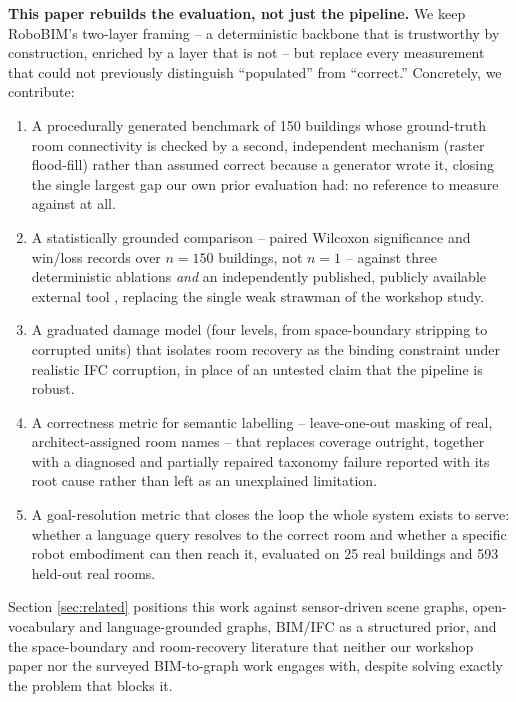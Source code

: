 \documentclass[a4paper, 10pt, conference]{ieeeconf}
\begin{document}
\textbf{This paper rebuilds the evaluation, not just the pipeline.} We keep RoboBIM's two-layer framing -- a deterministic backbone that is trustworthy by construction, enriched by a layer that is not -- but replace every measurement that could not previously distinguish ``populated'' from ``correct.'' Concretely, we contribute:
\begin{enumerate}
\setlength{\itemsep}{1pt}
\item A procedurally generated benchmark of 150 buildings whose ground-truth room connectivity is checked by a second, independent mechanism (raster flood-fill) rather than assumed correct because a generator wrote it, closing the single largest gap our own prior evaluation had: no reference to measure against at all.
\item A statistically grounded comparison -- paired Wilcoxon significance and win/loss records over $n=150$ buildings, not $n=1$ -- against three deterministic ablations \emph{and} an independently published, publicly available external tool \cite{bjornskov2024ifc2graph}, replacing the single weak strawman of the workshop study.
\item A graduated damage model (four levels, from space-boundary stripping to corrupted units) that isolates room recovery as the binding constraint under realistic IFC corruption, in place of an untested claim that the pipeline is robust.
\item A correctness metric for semantic labelling -- leave-one-out masking of real, architect-assigned room names -- that replaces coverage outright, together with a diagnosed and partially repaired taxonomy failure reported with its root cause rather than left as an unexplained limitation.
\item A goal-resolution metric that closes the loop the whole system exists to serve: whether a language query resolves to the correct room and whether a specific robot embodiment can then reach it, evaluated on 25 real buildings and 593 held-out real rooms.
\end{enumerate}

Section \ref{sec:related} positions this work against sensor-driven scene graphs, open-vocabulary and language-grounded graphs, BIM/IFC as a structured prior, and the space-boundary and room-recovery literature that neither our workshop paper nor the surveyed BIM-to-graph work engages with, despite solving exactly the problem that blocks it.

\end{document}
